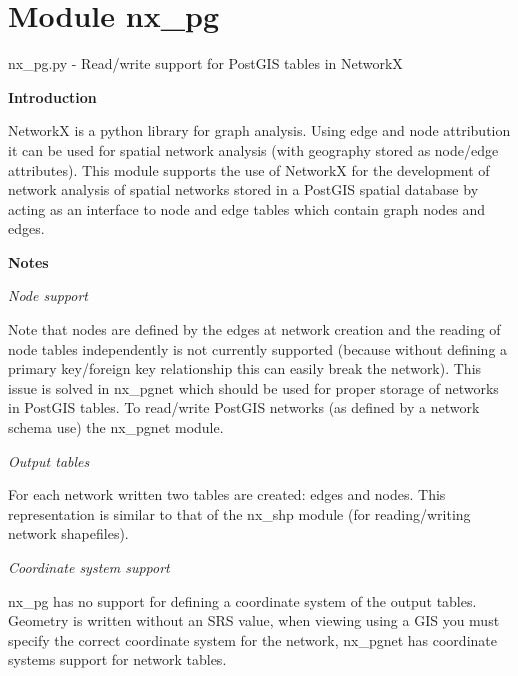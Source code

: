 %
%
%


\section{Module nx\_pg}

    \label{nx_pg}
nx\_pg.py - Read/write support for PostGIS tables in NetworkX

\textbf{Introduction}

NetworkX is a python library for graph analysis. Using edge and node 
attribution it can be used for spatial network analysis (with geography 
stored as node/edge attributes). This module supports the use of NetworkX 
for the development of network analysis of spatial networks stored in a 
PostGIS spatial database by acting as an interface to node and edge tables 
which contain graph nodes and edges.

\textbf{Notes}

\textit{Node support}

Note that nodes are defined by the edges at network creation and the 
reading of node tables independently is not currently supported (because 
without defining a primary key/foreign key relationship this can easily 
break the network). This issue is solved in nx\_pgnet which should be used 
for proper storage of networks in PostGIS tables. To read/write PostGIS 
networks (as defined by a network schema use) the nx\_pgnet module.

\textit{Output tables}

For each network written two tables are created: edges and nodes. This 
representation is similar to that of the nx\_shp module (for 
reading/writing network shapefiles).

\textit{Coordinate system support}

nx\_pg has no support for defining a coordinate system of the output 
tables. Geometry is written without an SRS value, when viewing using a GIS 
you must specify the correct coordinate system for the network, nx\_pgnet 
has coordinate systems support for network tables.

